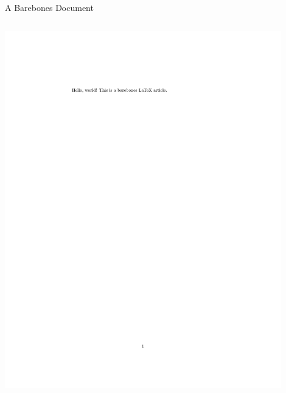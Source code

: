 \documentclass[aspectratio=1610]{beamer}
\begin{document}
\begin{frame}[fragile]{A Barebones Document}
\begin{columns}[T]

      \includegraphics[width=0.9\textwidth, frame]{example_article.pdf}

  \end{columns}
\end{frame}
\end{document}
